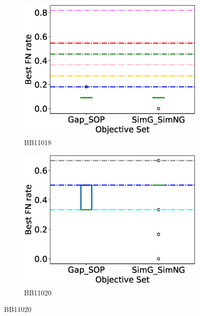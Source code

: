 \begin{figure}[!htbp]
\begin{adjustwidth}{-1cm}{-1cm}
\begin{subfigure}{0.26\textwidth}
		\end{subfigure}    
		\begin{subfigure}{0.26\textwidth}
			\includegraphics[width=\columnwidth]{Figure/summary/precomputedInit/Balibase/BB11018_objset_fnrate_rank}
			\caption{BB11018}
		\end{subfigure}
		\begin{subfigure}{0.26\textwidth}
			\includegraphics[width=\columnwidth]{Figure/summary/precomputedInit/Balibase/BB11020_objset_fnrate_rank}
			\caption{BB11020}
		\end{subfigure}

\end{adjustwidth}
\end{figure}
